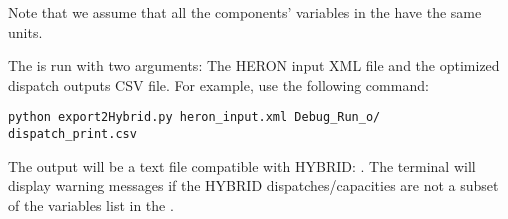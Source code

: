 \begin{enumerate}
Note that we assume that all the components' variables in the  have the same units. 
 
 The  is run with two arguments: The HERON input XML file and the optimized dispatch outputs CSV file. For example, use the following command:
 
 \begin{lstlisting}
python export2Hybrid.py heron_input.xml Debug_Run_o/
dispatch_print.csv
 \end{lstlisting}

The output will be a text file compatible with HYBRID:    . The terminal will display warning messages if the HYBRID dispatches/capacities are not a subset of the variables list in the .    

\end{enumerate}
